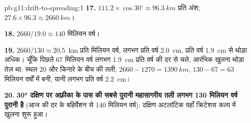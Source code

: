 \begin{solution}{pb:g11:drift-to-spreading:1}
\textbf{17.} $111.2 \times \cos 30^\circ \approx \qty{96.3}{km}$ प्रति अंश;
$27.6 \times 96.3 \approx \qty{2660}{km}$।

\textbf{18.} $2660/19.0 \approx 140$ मिलियन वर्ष।

\textbf{19.} $2660/130 \approx \num{20.5}$~km प्रति मिलियन वर्ष, लगभग
प्रति वर्ष \qty{2.0}{cm}, प्रति वर्ष \qty{1.9}{cm} से थोड़ा अधिक। चूँकि पिछले
67 मिलियन वर्ष लगभग \qty{1.9}{cm} प्रति वर्ष की दर से चले, आरंभिक खुलना
थोड़ा तेज़ था: स्थल 20 और किनारे के बीच की तली, $2660 - 1270 =
\qty{1390}{km}$, $130 - 67 = 63$ मिलियन वर्षों में बनी, यानी लगभग
प्रति वर्ष \qty{2.2}{cm}।

\textbf{20.} \textbf{\ang{30} दक्षिण पर अफ़्रीका के पास की सबसे पुरानी महासागरीय तली
लगभग 130 मिलियन वर्ष पुरानी है} (आज की दर के बहिर्वेशन से 140 मिलियन वर्ष):
दक्षिण अटलांटिक वहाँ क्रिटेशस कल्प में खुलना शुरू हुआ।
\end{solution}
